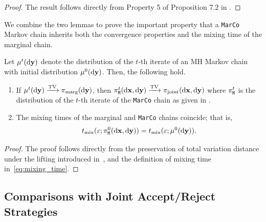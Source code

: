 \documentclass[onefignum,onetabnum]{siamonline250211}
\renewcommand{\d} {{\rm d}}                                %
\newcommand{\bfx}{{\bf x}}
\newcommand{\bfy}{{\bf y}}
\newcommand{\pjoint}{\pi_{\rm joint}}
\newcommand{\pmarg}{\pi_{\rm marg}}
\newcommand{\MarCo}{\textnormal{\texttt{MarCo}}\xspace}
\begin{document}
\begin{proof}
The result follows directly from Property 5 of Proposition 7.2 in \cite{polyanskiy_information_2025}.
\end{proof}

We combine the two lemmas to prove the important property
%
that a \MarCo Markov chain inherits both the convergence properties and the mixing time of the marginal chain.

%
%
%

\begin{theorem}[\MarCo Convergence]
\label{thm:MarCo_inherits_marginal}
Let $\mu^t(\d\bfy)$ denote the distribution of the $t$-th iterate of an MH Markov chain
with initial distribution $\mu^0(\d\bfy)$.
%
%
Then, the following hold.
	\begin{enumerate}[leftmargin=*, label=(\alph*)]
	\item If $\mu^t(\d\bfy) \xrightarrow{\rm TV} \pmarg(\d \bfy)$, then $\pi_{\tt M}^t(\d\bfx, \d\bfy) \xrightarrow{\rm TV} \pjoint(\d\bfx, \d\bfy)$ where $\pi_{\tt M}^t$ is the distribution of the $t$-th iterate of the \MarCo chain as given in .
	\item The mixing times of the marginal and \MarCo chains coincide; that is,
		\begin{align*}
		t_{{\rm mix}}(\varepsilon; \pi_{\tt M}^0(\d\bfx, \d\bfy)) = t_{{\rm mix}}(\varepsilon; \mu^0(\d\bfy)).
		\end{align*}
	\end{enumerate}


%
%
%
%
%
%
%
%
%
%
%
%
%
%
%
%
%
%
\end{theorem}

\begin{proof}
The proof follows directly from the %
preservation of total variation distance under the lifting introduced in~,
and the definition of mixing time in~\eqref{eq:mixing_time}.
%
%
%
%
%
%
%
%
%
%
%
%
%
\end{proof}
\subsection{Comparisons with Joint Accept/Reject Strategies}
\label{sec:marco_comparisons}
\end{document}
